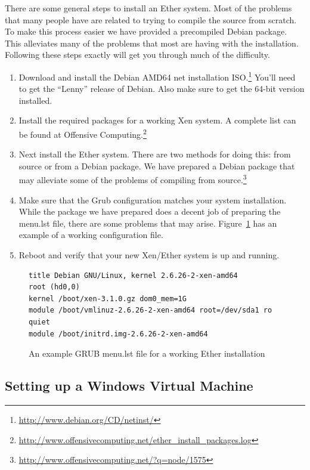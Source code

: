 \documentclass[11pt]{article}
\begin{document}
There are some general steps to install an Ether system. Most of the
problems that many people have are related to trying to compile the
source from scratch. To make this process easier we have provided a
precompiled Debian package. This alleviates many of the problems that
most are having with the installation. Following these steps exactly
will get you through much of the difficulty.

\begin{enumerate}
\item Download and install the Debian AMD64 net installation
ISO.\footnote{\url{http://www.debian.org/CD/netinst/}} You'll need to
get the ``Lenny'' release of Debian. Also make sure to get the 64-bit
version installed.
\item Install the required packages for a working Xen system. A
complete list can be found at Offensive Computing.\footnote{\url{http://www.offensivecomputing.net/ether_install_packages.log}}
\item Next install the Ether system. There are two methods for doing
this: from source or from a Debian package. We have prepared a Debian
package that may alleviate some of the problems of compiling from
source.\footnote{\url{http://www.offensivecomputing.net/?q=node/1575}}
\item Make sure that the Grub configuration matches your system
installation. While the package we have prepared does a decent job of
preparing the menu.lst file, there are some problems that may
arise. Figure~\ref{fig:menu_lst} has an example of a working
configuration file.
\item Reboot and verify that your new Xen/Ether system is up and
running.
\end{enumerate}

\begin{figure}[htb]
\centering
\begin{verbatim}
title Debian GNU/Linux, kernel 2.6.26-2-xen-amd64
root (hd0,0)
kernel /boot/xen-3.1.0.gz dom0_mem=1G
module /boot/vmlinuz-2.6.26-2-xen-amd64 root=/dev/sda1 ro quiet
module /boot/initrd.img-2.6.26-2-xen-amd64
\end{verbatim}
\caption{An example GRUB menu.lst file for a working Ether installation}\label{fig:menu_lst}
\end{figure}

\subsection{Setting up a Windows Virtual Machine}
\end{document}
